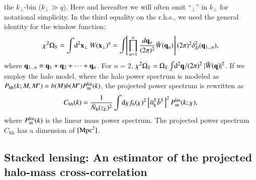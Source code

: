 \documentclass[onecolumn,notitlepage,showpacs,amsmath,amssymb,prd,floatfix]{revtex4-1}
\newcommand{\bx}{{\bf x}}
\newcommand{\btheta}{{\bm{\theta}}}
\newcommand{\bq}{{\bf q}}
\newcommand{\tW}{\tilde{W}}
\newcommand{\dr}{\mathrm{d}}
\newcommand{\phh}{P_{\mathrm{hh}}}
\newcommand{\chh}{C_{\mathrm{hh}}}
\newcommand{\bh}{\mathrm{h}}
\newcommand{\bnh}{\frac{\dr n}{\dr M}}
\newcommand{\bnhs}{\bar{n}_{\rm h}^S}
\newcommand{\pml}{P^{\rm lin}_{\rm m}}
\newcommand{\bNh}{\bar{N}_{\rm h}}
\begin{document}
the $k_\perp$-bin ($k_\perp \gg q$). Here and hereafter we will often
omit ``$_{\perp}$'' in $k_{\perp}$ for notational simplicity. In the
third equality on the r.h.s., we used the general identity for the
window function:
%
\begin{equation}
 \chi^2\Omega_S=\int\!\dr^2\bx_\perp~ W(\bx_\perp)^n=
  \int\!\!\left[\prod_{a=1}^n\frac{d\bq_a}{(2\pi)^2}\tW(\bq_a)\right](2\pi)^2
  \delta_D^2(\bq_{1\dots n}),
\end{equation}
%
where $\bq_{1\dots n}\equiv \bq_1+\bq_2+\cdots+\bq_n$. For $n=2$,
$\chi^2\Omega_S=\Omega_S\int\!\dr^2\bq/(2\pi)^2 ~ |\tW(\bq)|^2$.
%
If we employ the halo model, where the halo power spectrum is modeled as
$\phh(k; M, M')\simeq b(M)b(M')\pml(k)$, the projected power spectrum is
rewritten as
%
\begin{equation}
 \chh(k)=\frac{1}{\bNh(z_L)^2}\int\!\dr\chi
  f_\bh(\chi)^2 \left[\bnhs\bar{b}^S\right]^2
  \pml(k;\chi),
\end{equation}
%
where $\pml(k)$ is the linear mass power spectrum. The projected power
spectrum $\chh$ has a dimension of $[{\rm Mpc}^2]$.


\subsection{Stacked lensing: An estimator of the projected halo-mass cross-correlation}
\end{document}
